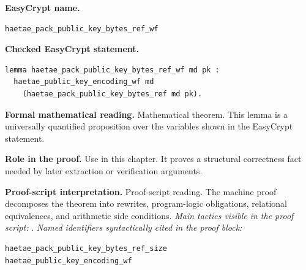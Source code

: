 \begin{formaltheorem}
\noindent\textbf{EasyCrypt name.}
\begin{lstlisting}[language=EasyCrypt,basicstyle=\ttfamily\scriptsize]
haetae_pack_public_key_bytes_ref_wf
\end{lstlisting}
\noindent\textbf{Checked EasyCrypt statement.}
\begin{lstlisting}[language=EasyCrypt,basicstyle=\ttfamily\scriptsize]
lemma haetae_pack_public_key_bytes_ref_wf md pk :
  haetae_public_key_encoding_wf md
    (haetae_pack_public_key_bytes_ref md pk).
\end{lstlisting}
\noindent\textbf{Formal mathematical reading.}
Mathematical theorem. This lemma is a universally quantified proposition over the variables shown in the EasyCrypt statement.

\noindent\textbf{Role in the proof.}
Use in this chapter. It proves a structural correctness fact needed by later extraction or verification arguments.

\noindent\textbf{Proof-script interpretation.}
Proof-script reading. The machine proof decomposes the theorem into rewrites, program-logic obligations, relational equivalences, and arithmetic side conditions.
\emph{Main tactics visible in the proof script:} .
\emph{Named identifiers syntactically cited in the proof block:}
\begin{lstlisting}[language=EasyCrypt,basicstyle=\ttfamily\scriptsize]
haetae_pack_public_key_bytes_ref_size
haetae_public_key_encoding_wf
\end{lstlisting}

\end{formaltheorem}

